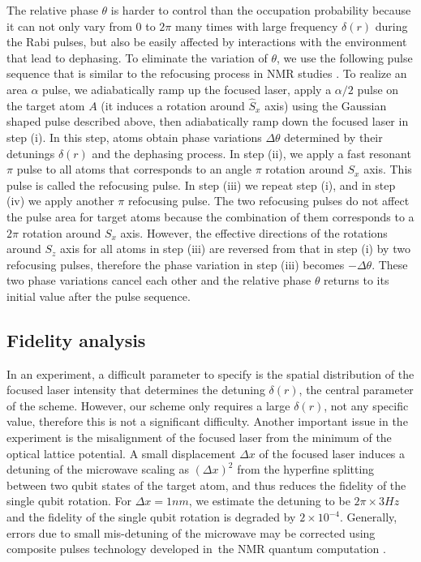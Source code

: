 \documentclass[pra,aps,showpacs,twocolumn]{revtex4}
\begin{document}
The relative phase $\theta $ is harder to control than the occupation
probability because it can not only vary from $0$ to $2\pi $ many times with
large frequency $\delta \left( r\right) $ during the Rabi pulses, but also
be easily affected by interactions with the environment that lead to
dephasing. To eliminate the variation of $\theta $, we use the following
pulse sequence that is similar to the refocusing process in NMR studies \cite%
{Nielsen}. To realize an area $\alpha $ pulse, we adiabatically ramp up the
focused laser, apply a $\alpha /2$ pulse on the target atom $A$ (it induces
a rotation around $\hat{S}_{x}$ axis) using the Gaussian shaped pulse
described above, then adiabatically ramp down the focused laser in step (i).
In this step, atoms obtain phase variations $\Delta \theta $ determined by
their detunings $\delta \left( r\right) $ and the dephasing process. In step
(ii), we apply a fast resonant $\pi $ pulse to all atoms that corresponds to
an angle $\pi $ rotation around $S_{x}$ axis. This pulse is called the
refocusing pulse. In step (iii) we repeat step (i), and in step (iv) we
apply another $\pi $ refocusing pulse. The two refocusing pulses do not
affect the pulse area for target atoms because the combination of them
corresponds to a $2\pi $ rotation around $S_{x}$ axis. However, the
effective directions of the rotations around $S_{z}$ axis for all atoms in
step (iii) are reversed from that in step (i) by two refocusing pulses,
therefore the phase variation in step (iii) becomes $-\Delta \theta $. These
two phase variations cancel each other and the relative phase $\theta $
returns to its initial value after the pulse sequence.

\subsection{Fidelity analysis}

In an experiment, a difficult parameter to specify is the spatial
distribution of the focused laser intensity that determines the detuning $%
\delta \left( r\right) $, the central parameter of the scheme. However, our
scheme only requires a large $\delta \left( r\right) $, not any specific
value, therefore this is not a significant difficulty. Another important
issue in the experiment is the misalignment of the focused laser from the
minimum of the optical lattice potential. A small displacement $\Delta x$ of
the focused laser induces a detuning of the microwave scaling as $\left(
\Delta x\right) ^{2}$ from the hyperfine splitting between two qubit states
of the target atom, and thus reduces the fidelity of the single qubit
rotation. For $\Delta x=1nm$, we estimate the detuning to be $2\pi \times
3Hz $ and the fidelity of the single qubit rotation is degraded by $2\times
10^{-4}$. Generally, errors due to small mis-detuning of the microwave may
be corrected using composite pulses technology developed in\ the NMR quantum
computation \cite{Jones}.
\end{document}
